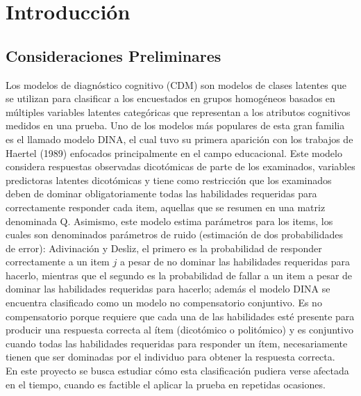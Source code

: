 \chapter[Introducción]{Introducción} \label{cap:introduccion}
	
	\section{Consideraciones Preliminares} \label{sec:consideraciones}
	
		Los modelos de diagn\'{o}stico cognitivo (CDM) son modelos de clases latentes que se utilizan para clasificar a los encuestados en grupos homog\'{e}neos basados en m\'{u}ltiples variables latentes categ\'{o}ricas que representan a los atributos cognitivos medidos en una prueba. Uno de los modelos m\'{a}s populares de esta gran familia es el llamado modelo DINA, el cual tuvo su primera aparici\'{o}n con los trabajos de Haertel (1989) enfocados principalmente en el campo educacional. Este modelo considera respuestas observadas dicot\'{o}micas de parte de los examinados, variables predictoras latentes dicot\'{o}micas y tiene como restricci\'{o}n que los examinados deben de dominar obligatoriamente todas las habilidades requeridas para correctamente responder cada item, aquellas que se resumen en una matriz denominada Q. Asimismo, este modelo estima par\'{a}metros para los items, los cuales son denominados par\'{a}metros de ruido (estimaci\'{o}n de dos probabilidades de error): Adivinaci\'{o}n y Desliz, el primero es la probabilidad de responder correctamente a un item $j$ a pesar de no dominar las habilidades requeridas para hacerlo, mientras que el segundo es la probabilidad de fallar a un item a pesar de dominar las habilidades requeridas para hacerlo; adem\'{a}s el modelo DINA se encuentra clasificado como un modelo no compensatorio conjuntivo. Es no compensatorio porque requiere que cada una de las habilidades est\'{e} presente para producir una respuesta correcta al \'{i}tem (dicot\'{o}mico o polit\'{o}mico) y es conjuntivo cuando todas las habilidades requeridas para responder un \'{i}tem, necesariamente tienen que ser dominadas por el individuo para obtener la respuesta correcta.\\           
		
		En este proyecto se busca estudiar c\'{o}mo esta clasificaci\'{o}n pudiera verse afectada en el tiempo, cuando es factible el aplicar la prueba en repetidas ocasiones. 
		\setlength{\parskip}{6mm}
		
